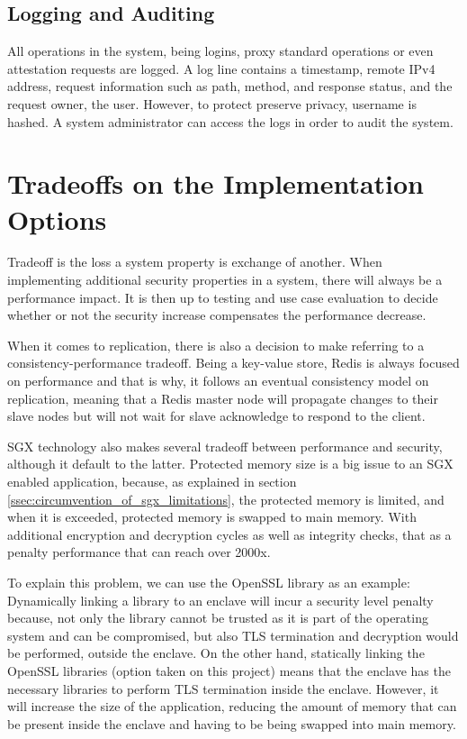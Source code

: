 \subsection{Logging and Auditing} 
\label{sec:logging_and_auditing}

All operations in the system, being logins, proxy standard operations or even attestation requests are logged. A log line contains a timestamp, remote \gls{IP}v4 address, request information such as path, method, and response status, and the request owner, the user. However, to protect preserve privacy, username is hashed. A system administrator can access the logs in order to audit the system.

\section{Tradeoffs on the Implementation Options}
\label{sec:tradeoffs_implementation_options}

Tradeoff is the loss a system property is exchange of another. When implementing additional security properties in a system, there will always be a performance impact. It is then up to testing and use case evaluation to decide whether or not the security increase compensates the performance decrease.

When it comes to replication, there is also a decision to make referring to a consistency-performance tradeoff. Being a key-value store, Redis is always focused on performance and that is why, it follows an eventual consistency model on replication, meaning that a Redis master node will propagate changes to their slave nodes but will not wait for slave acknowledge to respond to the client.

\gls{SGX} technology also makes several tradeoff between performance and security, although it default to the latter. Protected memory size is a big issue to an \gls{SGX} enabled application, because, as explained in section \ref{ssec:circumvention_of_sgx_limitations}, the protected memory is limited, and when it is exceeded, protected memory is swapped to main memory. With additional encryption and decryption cycles as well as integrity checks, that as a penalty performance that can reach over 2000x. 

To explain this problem, we can use the OpenSSL library as an example: Dynamically linking a library to an enclave will incur a security level penalty because, not only the library cannot be trusted as it is part of the operating system and can be compromised, but also \gls{TLS} termination and decryption would be performed, outside the enclave. On the other hand, statically linking the OpenSSL libraries (option taken on this project) means that the enclave has the necessary libraries to perform \gls{TLS} termination inside the enclave. However, it will increase the size of the application, reducing the amount of memory that can be present inside the enclave and having to be being swapped into main memory.

